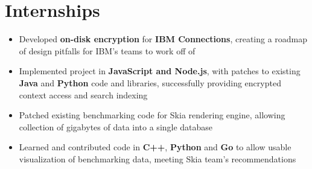 \documentclass{my_resume}
\begin{document}
\section{Internships}
\begin{flushleft}
\begin{itemize}[noitemsep]
  \item Developed \textbf{on-disk encryption} for \textbf{IBM Connections}, creating a roadmap of design pitfalls for IBM's teams to work off of
  \item Implemented project in \textbf{JavaScript and Node.js}, with patches to existing \textbf{Java} and \textbf{Python} code and libraries, successfully providing encrypted context access and search indexing
\end{itemize}
\end{flushleft}
\begin{flushleft}
\begin{itemize}[noitemsep]
  \item Patched existing benchmarking code for Skia rendering engine, allowing collection of gigabytes of data into a single database
  \item Learned and contributed code in \textbf{C++}, \textbf{Python} and \textbf{Go} to allow usable visualization of benchmarking data, meeting Skia team's recommendations
\end{itemize}
\end{flushleft}
\end{document}
